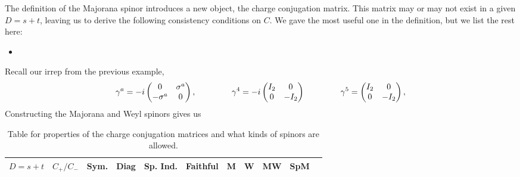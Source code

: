 \documentclass[11pt]{article}
\begin{document}
The definition of the Majorana spinor introduces a new object,
the charge conjugation matrix. This matrix may or may not exist
in a given $D = s + t$, leaving us to derive the following consistency
conditions on $C$. We gave the most useful one in the definition,
but we list the rest here:
\begin{itemize}
    \item {}
\end{itemize}

\begin{eexample}
    [Majorana and Weyl spinors in $D = 3 + 1$]
    Recall our irrep from the previous example,
    \begin{align*}
        \gamma^a = - i \begin{pmatrix}
            0 & \sigma^a\\
            - \sigma^a & 0
        \end{pmatrix},
        \hspace{1.5cm}
        \gamma^4 = -i \begin{pmatrix}
            I_2 & 0\\
            0 & -I_2
        \end{pmatrix}
        \hspace{1.5cm}
        \gamma^5 = \begin{pmatrix}
            I_2 & 0\\
            0 & -I_2
        \end{pmatrix},
    \end{align*}
    Constructing the Majorana and Weyl spinors gives us 
\end{eexample}





\begin{table}[H]
    \centering
    \begin{tabular}{|c|c|c|c|c|c|c|c|c|c|c|}
        \hline
        $D = s + t$ & $C_+/C_-$ & Sym. & Diag & Sp. Ind. & Faithful & M & W & MW & SpM\\
        \hline
    \end{tabular}
    \caption{Table for properties of the charge conjugation matrices
    and what kinds of spinors are allowed.}
\end{table}
\end{document}

